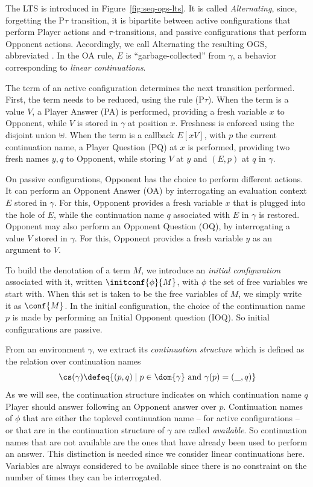 The LTS is introduced in Figure~\ref{fig:seq-ogs-lts}.
It is called \emph{Alternating}, since, forgetting the P$\tau$ transition,
it is bipartite between active configurations that perform Player actions and $\tau$-transitions,
and passive configurations that perform Opponent actions.  
Accordingly, we call Alternating the resulting OGS, abbreviated \AOGS. 
In the OA rule, $E$ is ``garbage-collected''  from $\gamma$,
a behavior corresponding to \emph{linear continuations}.

 
The term of an active configuration determines the next transition performed.
First, the term needs to be reduced, using the rule (P$\tau$).
When the term is a value $V$, a Player Answer (PA) is performed,
providing a fresh variable $x$ to Opponent, while $V$ is stored in $\gamma$ at position $x$. 
Freshness is enforced using the disjoint union $\uplus$.
When the term is a callback $E[xV]$, with $p$ the current continuation name,
a Player Question (PQ) at $x$ is performed, providing two fresh names $y,q$
to Opponent, while storing $V$ at $y$ and $(E,p)$ at $q$ in $\gamma$.

 
On passive configurations, Opponent has the choice to perform different actions.
It can  perform an Opponent Answer (OA) by interrogating an evaluation context 
$E$ stored in $\gamma$. For this, Opponent provides a fresh variable $x$ that is plugged into the hole of $E$,
while the continuation name $q$ associated with $E$ in $\gamma$ is restored.
Opponent may also  perform  an Opponent Question (OQ),
by interrogating a value $V$ stored in $\gamma$. 
For this, Opponent provides a fresh variable $y$ as an argument to $V$.


To build the denotation of a term $M$, we introduce an \emph{initial
configuration} associated with it, 
written $\initconf{\phi}{M}$, with $\phi$ the set of free variables we start with.
When this set is taken to be the free variables of $M$, we simply write it as $\conf{M}$.
In the initial configuration, the choice of the continuation
name $p$ is made by performing an Initial Opponent question
(IOQ). So initial configurations are passive.

From an environment $\gamma$, we extract its \emph{continuation structure}
which is defined
as the relation over continuation names 
\[\cs(\gamma) \defeq \{(p,q) \mid p \in \dom{\gamma} \text{ and } \gamma(p) = (\_,q)\}\]
As we will see, the continuation structure indicates
on which continuation name $q$ Player should answer 
following an Opponent answer over $p$.
Continuation names of $\phi$ that are either
the toplevel continuation name -- for active configurations --
or that are in the continuation structure of $\gamma$ are called \emph{available}.
So continuation names that are not available are the ones that
have already been used to perform an answer.
This distinction is needed since we consider linear continuations here.
Variables are always considered to be available since there is
no constraint on the number of times they can be interrogated.


